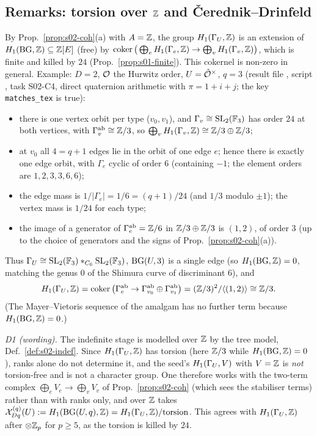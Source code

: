 \subsection{Remarks: torsion over $\mathbb{Z}$ and Čerednik--Drinfeld}\label{ss:s02-remarks}

\begin{remark}\label{rem:s02-torsion}
By Prop.~\ref{prop:s02-coh}(a) with $A=\mathbb{Z}$, the group $H_1(\Gamma_U,\mathbb{Z})$ is an extension of
$H_1(\mathrm{BG},\mathbb{Z})\subseteq\mathbb{Z}[E]$ (free) by
$\operatorname{coker}\big(\bigoplus_eH_1(\Gamma_e,\mathbb{Z})\to\bigoplus_vH_1(\Gamma_v,\mathbb{Z})\big)$, which is finite and killed by $24$ (Prop.~\ref{prop:s01-finite}).
This cokernel is non-zero in general. \stcomp{} Example: $D=2$, $\mathcal{O}$ the Hurwitz order, $U=\hat{\mathcal{O}}^\times$, $q=3$
(result file , script , task S02-C4,
direct quaternion arithmetic with $\pi=1+i+j$; the key \texttt{matches\_tex} is true):
\begin{itemize}
\item there is one vertex orbit per type ($v_0,v_1$), and $\Gamma_{v}\cong\mathrm{SL}_2(\mathbb{F}_3)$ has order $24$ at both vertices, with
$\Gamma_v^{\mathrm{ab}}\cong\mathbb{Z}/3$, so $\bigoplus_vH_1(\Gamma_v,\mathbb{Z})\cong\mathbb{Z}/3\oplus\mathbb{Z}/3$;
\item at $v_0$ all $4=q+1$ edges lie in the orbit of one edge $e$; hence there is exactly one edge orbit, with
$\Gamma_e$ cyclic of order $6$ (containing $-1$; the element orders are $1,2,3,3,6,6$);
\item the edge mass is $1/|\Gamma_e|=1/6=(q+1)/24$ (and $1/3$ modulo $\pm1$); the vertex mass is $1/24$ for each type;
\item the image of a generator of $\Gamma_e^{\mathrm{ab}}=\mathbb{Z}/6$ in $\mathbb{Z}/3\oplus\mathbb{Z}/3$ is $(1,2)$, of order $3$ (up to the choice of generators and the signs of Prop.~\ref{prop:s02-coh}(a)).
\end{itemize}
Thus $\Gamma_U\cong\mathrm{SL}_2(\mathbb{F}_3)*_{C_6}\mathrm{SL}_2(\mathbb{F}_3)$, $\mathrm{BG}(U,3)$ is a single edge (so $H_1(\mathrm{BG},\mathbb{Z})=0$, matching the genus $0$ of the Shimura curve
of discriminant $6$), and
\[H_1(\Gamma_U,\mathbb{Z})=\operatorname{coker}\big(\Gamma_e^{\mathrm{ab}}\to\Gamma_{v_0}^{\mathrm{ab}}\oplus\Gamma_{v_1}^{\mathrm{ab}}\big)=(\mathbb{Z}/3)^2/\langle(1,2)\rangle\cong\mathbb{Z}/3 .\]
(The Mayer--Vietoris sequence of the amalgam has no further term because $H_1(\mathrm{BG},\mathbb{Z})=0$.)

\emph{D1 (wording).} The indefinite stage is modelled over $\mathbb{Z}$ by the tree model, Def.~\ref{def:s02-indef}. Since
$H_1(\Gamma_U,\mathbb{Z})$ has torsion (here $\mathbb{Z}/3$ while $H_1(\mathrm{BG},\mathbb{Z})=0$), ranks alone do not determine it, and the seed's
$H_1(\Gamma_U,V)$ with $V=\mathbb{Z}$ is \emph{not} torsion-free and is not a character group. One therefore works with the two-term complex
$\bigoplus_e V_e\to\bigoplus_vV_v$ of Prop.~\ref{prop:s02-coh} (which sees the stabiliser terms) rather than with ranks
only, and over $\mathbb{Z}$ takes $\mathcal{X}^{(q)}_{Dq}(U):=H_1(\mathrm{BG}(U,q),\mathbb{Z})=H_1(\Gamma_U,\mathbb{Z})/\mathrm{torsion}$. This agrees with $H_1(\Gamma_U,\mathbb{Z})$ after
$\otimes\mathbb{Z}_p$ for $p\ge5$, as the torsion is killed by $24$.
\end{remark}

